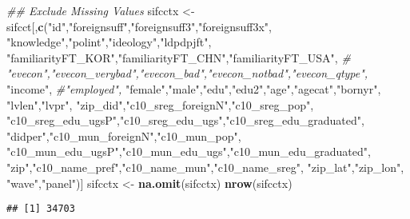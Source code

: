 \documentclass[
]{article}
\newenvironment{Shaded}{\begin{snugshade}}{\end{snugshade}}
\newcommand{\CommentTok}[1]{\textcolor[rgb]{0.56,0.35,0.01}{\textit{#1}}}
\newcommand{\KeywordTok}[1]{\textcolor[rgb]{0.13,0.29,0.53}{\textbf{#1}}}
\newcommand{\NormalTok}[1]{#1}
\newcommand{\OperatorTok}[1]{\textcolor[rgb]{0.81,0.36,0.00}{\textbf{#1}}}
\newcommand{\StringTok}[1]{\textcolor[rgb]{0.31,0.60,0.02}{#1}}
\begin{document}
\begin{Shaded}
\begin{Highlighting}[]
\CommentTok{## Exclude Missing Values}
\NormalTok{sifcctx <-}\StringTok{ }\NormalTok{sifcct[,}\KeywordTok{c}\NormalTok{(}\StringTok{"id"}\NormalTok{,}\StringTok{"foreignsuff"}\NormalTok{,}\StringTok{"foreignsuff3"}\NormalTok{,}\StringTok{"foreignsuff3x"}\NormalTok{,}
           \StringTok{"knowledge"}\NormalTok{,}\StringTok{"polint"}\NormalTok{,}\StringTok{"ideology"}\NormalTok{,}\StringTok{"ldpdpjft"}\NormalTok{,}
           \StringTok{"familiarityFT_KOR"}\NormalTok{,}\StringTok{"familiarityFT_CHN"}\NormalTok{,}\StringTok{"familiarityFT_USA"}\NormalTok{,}
           \CommentTok{# "evecon","evecon_verybad","evecon_bad","evecon_notbad","evecon_qtype",}
           \StringTok{"income"}\NormalTok{, }\CommentTok{#"employed",}
           \StringTok{"female"}\NormalTok{,}\StringTok{"male"}\NormalTok{,}\StringTok{"edu"}\NormalTok{,}\StringTok{"edu2"}\NormalTok{,}\StringTok{"age"}\NormalTok{,}\StringTok{"agecat"}\NormalTok{,}\StringTok{"bornyr"}\NormalTok{,}
           \StringTok{"lvlen"}\NormalTok{,}\StringTok{"lvpr"}\NormalTok{,}
           \StringTok{"zip_did"}\NormalTok{,}\StringTok{"c10_sreg_foreignN"}\NormalTok{,}\StringTok{"c10_sreg_pop"}\NormalTok{,}
           \StringTok{"c10_sreg_edu_ugsP"}\NormalTok{,}\StringTok{"c10_sreg_edu_ugs"}\NormalTok{,}\StringTok{"c10_sreg_edu_graduated"}\NormalTok{,}
           \StringTok{"didper"}\NormalTok{,}\StringTok{"c10_mun_foreignN"}\NormalTok{,}\StringTok{"c10_mun_pop"}\NormalTok{,}
           \StringTok{"c10_mun_edu_ugsP"}\NormalTok{,}\StringTok{"c10_mun_edu_ugs"}\NormalTok{,}\StringTok{"c10_mun_edu_graduated"}\NormalTok{,}
           \StringTok{"zip"}\NormalTok{,}\StringTok{"c10_name_pref"}\NormalTok{,}\StringTok{"c10_name_mun"}\NormalTok{,}\StringTok{"c10_name_sreg"}\NormalTok{,}
           \StringTok{"zip_lat"}\NormalTok{,}\StringTok{"zip_lon"}\NormalTok{,}
           \StringTok{"wave"}\NormalTok{,}\StringTok{"panel"}\NormalTok{)]}
\NormalTok{sifcctx <-}\StringTok{ }\KeywordTok{na.omit}\NormalTok{(sifcctx)}
\KeywordTok{nrow}\NormalTok{(sifcctx)}
\end{Highlighting}
\end{Shaded}

\begin{verbatim}
## [1] 34703
\end{verbatim}

\begin{Shaded}
\end{Shaded}
\end{document}
